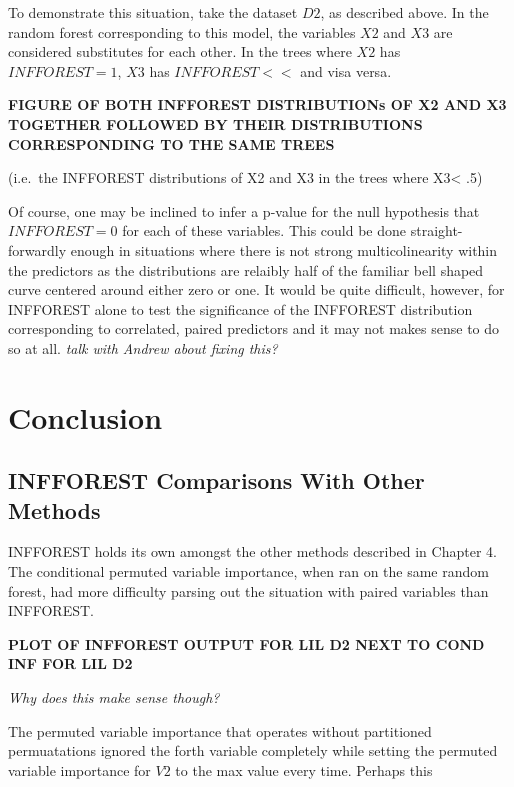 \documentclass[12pt,twoside]{reedthesis}
\begin{document}
  To demonstrate this situation, take the dataset \(D2\), as described
  above. In the random forest corresponding to this model, the variables
  \(X2\) and \(X3\) are considered substitutes for each other. In the
  trees where \(X2\) has \(INFFOREST = 1\), \(X3\) has \(INFFOREST <<\)
  and visa versa.
  
  \textbf{FIGURE OF BOTH INFFOREST DISTRIBUTIONs OF X2 AND X3 TOGETHER
  FOLLOWED BY THEIR DISTRIBUTIONS CORRESPONDING TO THE SAME TREES}
  
  (i.e.~the INFFOREST distributions of X2 and X3 in the trees where
  X3\textless{} .5)
  
  Of course, one may be inclined to infer a p-value for the null
  hypothesis that \(INFFOREST = 0\) for each of these variables. This
  could be done straight-forwardly enough in situations where there is not
  strong multicolinearity within the predictors as the distributions are
  relaibly half of the familiar bell shaped curve centered around either
  zero or one. It would be quite difficult, however, for INFFOREST alone
  to test the significance of the INFFOREST distribution corresponding to
  correlated, paired predictors and it may not makes sense to do so at
  all. \emph{talk with Andrew about fixing this?}
  
  \chapter*{Conclusion}\label{conclusion}
  
  \setcounter{chapter}{4} \setcounter{section}{0}
  
  \section{INFFOREST Comparisons With Other
  Methods}\label{infforest-comparisons-with-other-methods}
  
  INFFOREST holds its own amongst the other methods described in Chapter
  4. The conditional permuted variable importance, when ran on the same
  random forest, had more difficulty parsing out the situation with paired
  variables than INFFOREST.
  
  \textbf{PLOT OF INFFOREST OUTPUT FOR LIL D2 NEXT TO COND INF FOR LIL D2}
  
  \emph{Why does this make sense though?}
  
  The permuted variable importance that operates without partitioned
  permuatations ignored the forth variable completely while setting the
  permuted variable importance for \(V2\) to the max value every time.
  Perhaps this
  
\end{document}

